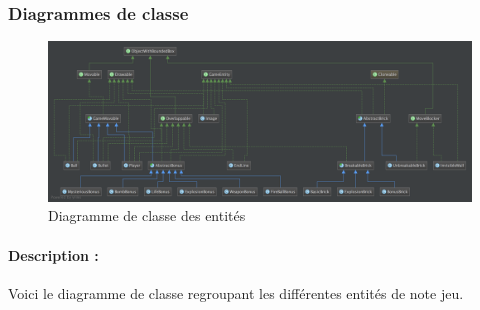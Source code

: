 \documentclass[a4paper,10pt]{article}
\begin{document}

	\subsubsection{Diagrammes de classe}

		\FloatBarrier
		\begin{figure}[!h]
    		\begin{center}
	  	  	\includegraphics[scale=0.175]{images/entitiesDiag.png}
          	\caption{Diagramme de classe des entités}
    		\end{center}
		\end{figure}
		\FloatBarrier
		\paragraph{Description :}
		Voici le diagramme de classe regroupant les différentes entités de note jeu. \\

\end{document}
